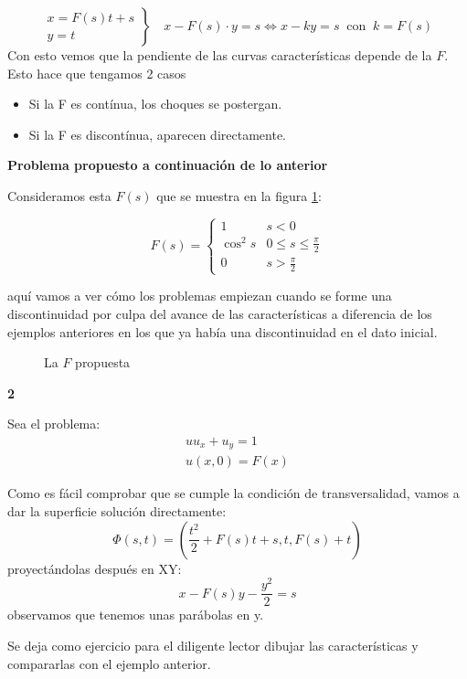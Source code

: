 \begin{example}{1}
		\[
		\left.
		\begin{array}{r}
		x = F(s)t + s \\
		y = t
		\end{array}
		\right\} \quad x - F(s)\cdot y = s \iff x - ky = s \ \text{ con } \ k = F(s)
		\]
		Con esto vemos que la pendiente de las curvas características depende de la $F$. Esto hace que tengamos 2 casos
		\begin{itemize}
			\item Si la F es contínua, los choques se postergan.
			\item Si la F es discontínua, aparecen directamente.
		\end{itemize}


	\end{example}

	\textbf{Problema propuesto a continuación de lo anterior}

	Consideramos esta $F(s)$ que se muestra en la figura \ref{fig:Ejemplo-02-09-suave}:

	\[
	F(s) =
	\begin{cases}
	1 & s < 0 \\
	\cos^2 s & 0 \leq s \leq \frac{\pi}{2} \\
	0 & s > \frac{\pi}{2}
	\end{cases}
	\]

	aquí vamos a ver cómo los problemas empiezan cuando se forme una discontinuidad por culpa del avance de las características a diferencia de los ejemplos anteriores en los que ya había una discontinuidad en el dato inicial.

	\begin{figure}[hbtp]
		\centering
		\caption{La $F$ propuesta}
		\label{fig:Ejemplo-02-09-suave}
	\end{figure}

	\begin{example}{\bf 2}

		\noindent Sea el problema:
		\[
		\begin{array}{l}
			u u_x + u_y = 1 \\
			u(x,0) = F(x)
		\end{array}
		\]

		Como es fácil comprobar que se cumple la condición de transversalidad, vamos a dar la superficie solución directamente:
		\[ \Phi(s,t) = (\frac{t^2}{2} + F(s) t + s, t, F(s) + t) \] proyectándolas después en XY: \[ x - F(s)y - \frac{y^2}{2} = s \] observamos que tenemos unas parábolas en y.

		Se deja como ejercicio para el diligente lector dibujar las características y compararlas con el ejemplo anterior.

	\end{example}

